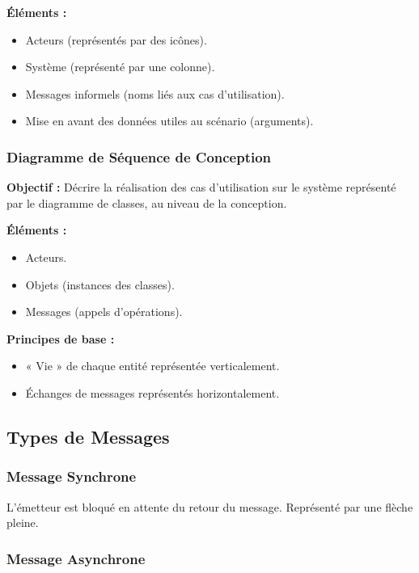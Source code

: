 \documentclass{article}
\begin{document}
\begin{itemize}
\textbf{Éléments :}

\begin{itemize}
    \item Acteurs (représentés par des icônes).
    \item Système (représenté par une colonne).
    \item Messages informels (noms liés aux cas d'utilisation).
    \item Mise en avant des données utiles au scénario (arguments).
\end{itemize}

\subsubsection{Diagramme de Séquence de Conception}

\textbf{Objectif :} Décrire la réalisation des cas d'utilisation sur le système représenté par le diagramme de classes, au niveau de la conception.

\textbf{Éléments :}

\begin{itemize}
    \item Acteurs.
    \item Objets (instances des classes).
    \item Messages (appels d'opérations).
\end{itemize}

\textbf{Principes de base :}

\begin{itemize}
    \item « Vie » de chaque entité représentée verticalement.
    \item Échanges de messages représentés horizontalement.
\end{itemize}

\subsection{Types de Messages}

\subsubsection{Message Synchrone}

L'émetteur est bloqué en attente du retour du message. Représenté par une flèche pleine.

\subsubsection{Message Asynchrone}


\end{itemize}
\end{document}
